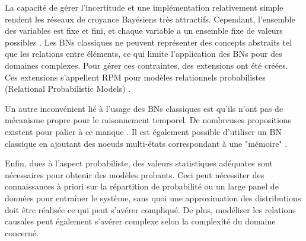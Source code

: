 \documentclass[a4paper,11pt,twoside]{StyleThese}
\begin{document}
La capacité de gérer l'incertitude et une implémentation relativement simple rendent les réseaux de croyance Bayésiens très attractifs.
Cependant, l'ensemble des variables est fixe et fini, et chaque variable a un ensemble fixe de valeurs possibles \cite{russell2003artificial}.
Les BNs classiques ne peuvent représenter des concepts abstraits tel que les relations entre éléments, ce qui limite l'application des BNs pour
des domaines complexes. Pour gérer ces contraintes, des extensions ont été créées. Ces extensions s'appellent RPM pour modèles relationnels probabilistes (Relational Probabilistic Models) \cite{howard2005situation,russell2003artificial}.

Un autre inconvénient lié à l'usage des BNs classiques est qu'ils n'ont pas de mécanisme propre pour le raisonnement temporel.
De nombreuses propositions existent pour palier à ce manque \cite{russell2003artificial}. Il est également possible d'utiliser un BN classique en ajoutant des noeuds multi-états correspondant à une "mémoire" \cite{higgins2005automatic}.

Enfin, dues à l'aspect probabiliste, des valeurs statistiques adéquates sont nécessaires pour obtenir des modèles probants.
Ceci peut nécessiter des connaissances à priori sur la répartition de probabilité ou un large panel de données pour entraîner le système, sans quoi une approximation des distributions doit être réalisée ce qui peut s'avérer compliqué. De plus, modéliser les relations causales peut également s'avérer complexe selon la complexité du domaine concerné.



\end{document}

